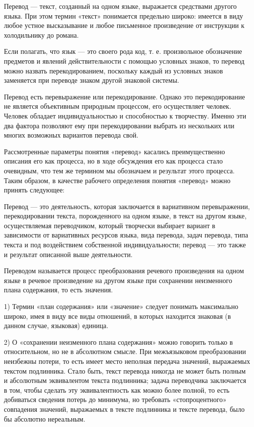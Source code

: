 Перевод --- текст, созданный на одном языке, выражается средствами дру­гого языка. При этом термин «текст» пони­мается предельно широко: имеется в виду любое устное высказыва­ние и любое письменное произведение от инструкции к холодильнику до романа.

Если полагать, что язык --- это своего рода код, т. е. произвольное обозначение предметов и явлений действительности с помощью ус­ловных знаков, то перевод можно назвать перекодированием, посколь­ку каждый из условных знаков заменяется при переводе знаком дру­гой знаковой системы.

Перевод есть перевыражение или перекодирование. Одна­ко это перекодирование не является объективным природным про­цессом, его осуществляет человек. Человек обладает индивидуаль­ностью и способностью к творчеству. Именно эти два фактора позволяют ему при перекодировании выбрать из нескольких или многих возможных вариантов перевода свой.

Рассмотренные параметры понятия «перевод» касались пре­имущественно описания его как процесса, но в ходе обсуждения его как процесса стало очевидным, что тем же термином мы обозначаем и результат этого процесса. Таким образом, в качестве рабочего оп­ределения понятия «перевод» можно принять следующее:

Перевод --- это деятельность, которая заключается в вариативном перевыражении, перекодировании текста, порожденного на од­ном языке, в текст на другом языке, осуществляемая переводчиком, который творчески выбирает вариант в зависимости от вариативных ресурсов языка, вида перевода, задач перевода, типа текста и под воздействием собственной индивидуальности; перевод --- это также и результат описанной выше деятельности.

Переводом называется процесс преобразования речевого произведения на одном языке в речевое произведение на другом языке при сохранении неизменного плана содержания, то есть значения.

1) Термин «план содержания» или «значение» следует понимать максимально широко, имея в виду все виды отношений, в которых находится знаковая (в данном случае, языковая) единица. 

2) О «сохранении неизменного плана содержания» можно говорить только в относительном, но не в абсолютном смысле. При межъязыковом преобразовании неизбежны потери, то есть имеет место неполная передача значений, выражаемых текстом подлинника. Стало быть, текст перевода никогда не может быть полным и абсолютным эквивалентом текста подлинника; задача переводчика заключается в том, чтобы сделать эту эквивалентность как можно более полной, то есть добиваться сведения потерь до минимума, но требовать «стопроцентного» совпадения значений, выражаемых в тексте подлинника и тексте перевода, было бы абсолютно нереальным. %

